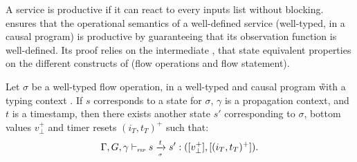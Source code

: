 A service is productive if it can react to every inputs list without blocking.  ensures that the operational semantics of a well-defined service
(\ie well-typed, in a causal program) is productive by guaranteeing that its observation function
is well-defined.
%
Its proof relies on the intermediate , that state equivalent properties on the different
constructs of \GRFRP (flow operations and flow statement).

\begin{lemma}
    \label{lem:semantics:grfrp:theorems:productivity:flowop}
    Let $\sigma$ be a well-typed flow operation, in a well-typed and causal program \G with a
    typing context \tyCtx.
    If $s$ corresponds to a state for $\sigma$, $\gamma$ is a propagation context, and $t$ is a
    timestamp, then there exists another state $s'$ corresponding to $\sigma$, bottom values
    $v_\bot^+$ and timer resets $(i_T, t_T)^+$ such that:
    \begin{equation*}
        \Gamma, G, \gamma \vdash_{\textnormal{\tiny\textsc{frp}}} s \xrightarrow[\mbox{\tiny\ensuremath{\sigma}}]{t} s': ([v_\bot^+], [(i_T, t_T)^+]).
    \end{equation*}
\end{lemma}

